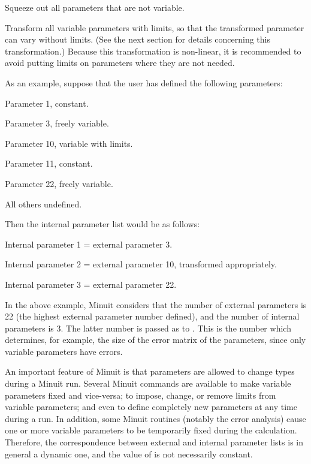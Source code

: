 \begin{OL}
\item Squeeze out all parameters that are not variable.
\item Transform all variable parameters with limits, so that the transformed
      parameter can vary without limits.
      (See the next section for details concerning this transformation.)
      Because this transformation is non-linear, it is recommended to avoid
      putting limits on parameters where they are not needed.
\end{OL}

As an example, suppose that the user has defined the following parameters:
\begin{UL}
\item Parameter 1, constant.
\item Parameter 3, freely variable.
\item Parameter 10, variable with limits.
\item Parameter 11, constant.
\item Parameter 22, freely variable.
\item All others undefined.
\end{UL}
Then the internal parameter list would be as follows:
\begin{UL}
\item Internal parameter 1 = external parameter 3.
\item Internal parameter 2 = external parameter 10, transformed appropriately.
\item Internal parameter 3 = external parameter 22.
\end{UL}
In the above example, Minuit considers that the number of external parameters
is 22 (the highest external parameter number defined), and the number of
internal parameters is 3.  The latter number is passed as  to .
This is the number which determines, for example, the size of the error matrix
of the parameters, since only variable parameters have errors.
 
An important feature of Minuit is that parameters are allowed to change
types during a Minuit run. Several Minuit commands are available to make
variable parameters fixed and vice-versa; to impose, change, or remove limits
from variable parameters; and even to define completely new parameters at any
time during a run. In addition, some Minuit routines (notably the  error
analysis) cause one or more variable parameters to be temporarily fixed during
the calculation.  Therefore, the correspondence between external and internal
parameter lists is in general a dynamic one, and the value of  is not
necessarily constant.


